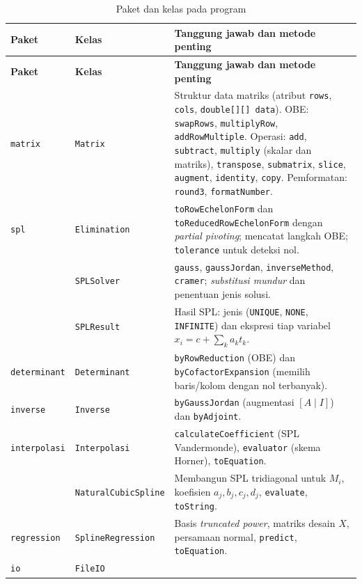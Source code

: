 \documentclass[12pt,a4paper]{article}
\begin{document}
{\small\renewcommand{\arraystretch}{1.2}
\begin{longtable}{@{}p{2.7cm}p{3.3cm}p{8.2cm}@{}}
\caption{Paket dan kelas pada program}\\
\toprule
\textbf{Paket} & \textbf{Kelas} & \textbf{Tanggung jawab dan metode penting}\\
\midrule\endfirsthead
\toprule
\textbf{Paket} & \textbf{Kelas} & \textbf{Tanggung jawab dan metode penting}\\
\midrule\endhead
\texttt{matrix} & \texttt{Matrix} &
 Struktur data matriks (atribut \texttt{rows}, \texttt{cols}, \texttt{double[][] data}). OBE: \texttt{swapRows}, \texttt{multiplyRow}, \texttt{addRowMultiple}. Operasi: \texttt{add}, \texttt{subtract}, \texttt{multiply} (skalar dan matriks), \texttt{transpose}, \texttt{submatrix}, \texttt{slice}, \texttt{augment}, \texttt{identity}, \texttt{copy}. Pemformatan: \texttt{round3}, \texttt{formatNumber}.\\
\addlinespace
\texttt{spl} & \texttt{Elimination} &
 \texttt{toRowEchelonForm} dan \texttt{toReducedRowEchelonForm} dengan \textit{partial pivoting}; mencatat langkah OBE; \texttt{tolerance} untuk deteksi nol.\\
 & \texttt{SPLSolver} &
 \texttt{gauss}, \texttt{gaussJordan}, \texttt{inverseMethod}, \texttt{cramer}; \textit{substitusi mundur} dan penentuan jenis solusi.\\
 & \texttt{SPLResult} &
 Hasil SPL: jenis (\texttt{UNIQUE}, \texttt{NONE}, \texttt{INFINITE}) dan ekspresi tiap variabel $x_i=c+\sum_k a_kt_k$.\\
\addlinespace
\texttt{determinant} & \texttt{Determinant} &
 \texttt{byRowReduction} (OBE) dan \texttt{byCofactorExpansion} (memilih baris/kolom dengan nol terbanyak).\\
\texttt{inverse} & \texttt{Inverse} &
 \texttt{byGaussJordan} (augmentasi $[A\mid I]$) dan \texttt{byAdjoint}.\\
\texttt{interpolasi} & \texttt{Interpolasi} &
 \texttt{calculateCoefficient} (SPL Vandermonde), \texttt{evaluator} (skema Horner), \texttt{toEquation}.\\
 & \texttt{NaturalCubicSpline} &
 Membangun SPL tridiagonal untuk $M_i$, koefisien $a_j,b_j,c_j,d_j$, \texttt{evaluate}, \texttt{toString}.\\
\texttt{regression} & \texttt{SplineRegression} &
 Basis \textit{truncated power}, matriks desain $X$, persamaan normal, \texttt{predict}, \texttt{toEquation}.\\
\addlinespace
\texttt{io} & \texttt{FileIO} &

\end{longtable}}
\end{document}
